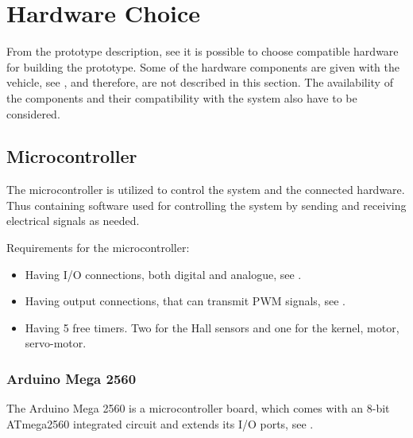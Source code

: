 \section{Hardware Choice} \label{Hardwarechoice}
From the prototype description, see  it is possible to choose compatible hardware for building the prototype. 
Some of the hardware components are given with the vehicle, see , and therefore, are not described in this section. 
The availability of the components and their compatibility with the system also have to be considered.


\subsection{Microcontroller}
The microcontroller is utilized to control the system and the connected hardware. Thus containing software used for controlling the system by sending and receiving electrical signals as needed.

Requirements for the microcontroller:
\begin{itemize}
\item Having I/O connections, both digital and analogue, see .
\item Having output connections, that can transmit PWM signals, see .
\item Having 5 free timers. Two for the Hall sensors and one for the kernel, motor, servo-motor.
\end{itemize}

\subsubsection{Arduino Mega 2560}
The Arduino Mega 2560 is a microcontroller board, which comes with an 8-bit ATmega2560 integrated circuit and extends its I/O ports, see  \cite{MegaInfo}. 

